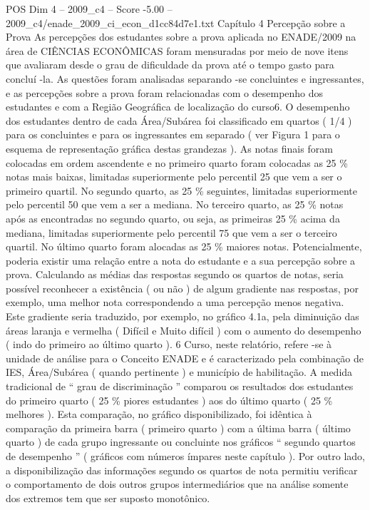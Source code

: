 \begin{textsample}{POS Dim 4 – 2009\_c4 – Score -5.00 – 2009\_c4/enade\_2009\_ci\_econ\_d1cc84d7e1.txt}  \label{ex:f4_pos_331}
Capítulo 4 Percepção sobre a Prova As percepções dos estudantes sobre a prova aplicada no ENADE/2009 na área de CIÊNCIAS ECONÔMICAS foram mensuradas por meio de nove itens que avaliaram desde o grau de dificuldade da prova até o tempo gasto para concluí -la.
As questões foram analisadas separando -se concluintes e ingressantes, e as percepções sobre a prova foram relacionadas com o desempenho dos estudantes e com a Região Geográfica de localização do curso6.
O desempenho dos estudantes dentro de cada Área/Subárea foi classificado em quartos ( 1/4 ) para os concluintes e para os ingressantes em separado ( ver Figura 1 para o esquema de representação gráfica destas grandezas ).
As notas finais foram colocadas em ordem ascendente e no primeiro quarto foram colocadas as 25 \% notas mais baixas, limitadas superiormente pelo percentil 25 que vem a ser o primeiro quartil.
No segundo quarto, as 25 \% seguintes, limitadas superiormente pelo percentil 50 que vem a ser a mediana.
No terceiro quarto, as 25 \% notas após as encontradas no segundo quarto, ou seja, as primeiras 25 \% acima da mediana, limitadas superiormente pelo percentil 75 que vem a ser o terceiro quartil.
No último quarto foram alocadas as 25 \% maiores notas.
Potencialmente, poderia existir uma relação entre a nota do estudante e a sua percepção sobre a prova.
Calculando as médias das respostas segundo os quartos de notas, seria possível reconhecer a existência ( ou não ) de algum gradiente nas respostas, por exemplo, uma melhor nota correspondendo a uma percepção menos negativa.
Este gradiente seria traduzido, por exemplo, no gráfico 4.1a, pela diminuição das áreas laranja e vermelha ( Difícil e Muito difícil ) com o aumento do desempenho ( indo do primeiro ao último quarto ). 6 Curso, neste relatório, refere -se à unidade de análise para o Conceito ENADE e é caracterizado pela combinação de IES, Área/Subárea ( quando pertinente ) e município de habilitação.
A medida tradicional de “ grau de discriminação ” comparou os resultados dos estudantes do primeiro quarto ( 25 \% piores estudantes ) aos do último quarto ( 25 \% melhores ).
Esta comparação, no gráfico disponibilizado, foi idêntica à comparação da primeira barra ( primeiro quarto ) com a última barra ( último quarto ) de cada grupo ingressante ou concluinte nos gráficos “ segundo quartos de desempenho ” ( gráficos com números ímpares neste capítulo ).
Por outro lado, a disponibilização das informações segundo os quartos de nota permitiu verificar o comportamento de dois outros grupos intermediários que na análise somente dos extremos tem que ser suposto monotônico.

\end{textsample}
